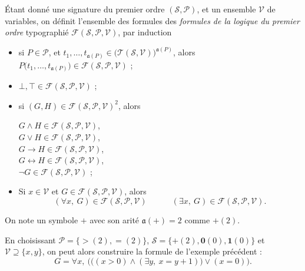 \begin{defn}
	Étant donné une signature du premier ordre $(\mathcal{S}, \mathcal{P})$, et un ensemble $\mathcal{V}$\/ de variables, on définit l'ensemble des formules des \textit{formules de la logique du premier ordre} typographié $\mathcal{F}(\mathcal{S}, \mathcal{P}, \mathcal{V})$, par induction 
	\begin{itemize}
		\item si $P \in \mathcal{P}$, et $t_1, \ldots, t_{\mathfrak{a}(P)} \in \big(\mathcal{T}(\mathcal{S}, \mathcal{V})\big)^{\mathfrak{a}(P)}$, alors $P\big(t_1, \ldots, t_{\mathfrak{a}(P)}\big) \in  \mathcal{F}(\mathcal{S}, \mathcal{P},\mathcal{V})$ ;
		\item $\bot,\top \in \mathcal{F}(\mathcal{S},\mathcal{P},\mathcal{V})$\/ ;
		\item si $(G, H) \in \mathcal{F}(\mathcal{S}, \mathcal{P}, \mathcal{V})^2$, alors
			\begin{multicols}{3}
				$G \land H \in \mathcal{F}(\mathcal{S}, \mathcal{P}, \mathcal{V})$,\\
				$G \lor H \in \mathcal{F}(\mathcal{S}, \mathcal{P}, \mathcal{V})$,\\
				$G \to H \in \mathcal{F}(\mathcal{S}, \mathcal{P}, \mathcal{V})$,\\
				$G \leftrightarrow H \in \mathcal{F}(\mathcal{S}, \mathcal{P}, \mathcal{V})$,\\
				$\lnot G \in \mathcal{F}(\mathcal{S}, \mathcal{P}, \mathcal{V})$ ;
			\end{multicols}
		\item Si $x \in \mathcal{V}$\/ et $G \in \mathcal{F}(\mathcal{S}, \mathcal{P}, \mathcal{V})$, alors  \[
				(\forall x,\: G) \in \mathcal{F}(\mathcal{S}, \mathcal{P}, \mathcal{V})
				\quad\quad\quad
				(\exists x,\: G) \in \mathcal{F}(\mathcal{S}, \mathcal{P}, \mathcal{V})
			.\]
	\end{itemize}
\end{defn}

On note un symbole $\mathbf{+}$\/ avec son arité $\mathfrak{a}(\mathbf{+}) = 2$\/ comme $\mathbf{+}(2)$.

\begin{exm}
	En choisissant $\mathcal{P} = \{{\mathbf{>}}(2), {\mathbf{=}}(2)\}$, $\mathcal{S} = \{{\mathbf{+}}(2), \mathbf{0}(0), \mathbf{1}(0)\}$\/ et $\mathcal{V} \supseteq \{x,y\}$, on peut alors construire la formule de l'exemple précédent : \[
		G = \forall x,\:\Big(\big((x > 0) \land (\exists y,\: x = y + 1)\big) \lor (x = 0)\Big)
	.\] 
\end{exm}

